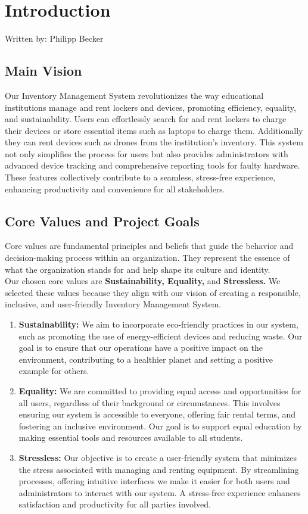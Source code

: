 \section{Introduction}
{\tiny Written by: Philipp Becker}\\
\subsection{Main Vision}
Our Inventory Management System revolutionizes the way educational institutions manage and rent lockers and devices, promoting efficiency, equality, and sustainability. Users can effortlessly search for and rent lockers to charge their devices or store essential items such as laptops to charge them. Additionally they can rent devices such as drones from the institution's inventory. This system not only simplifies the process for users but also provides administrators with advanced device tracking and comprehensive reporting tools for faulty hardware. These features collectively contribute to a seamless, stress-free experience, enhancing productivity and convenience for all stakeholders.

\subsection{Core Values and Project Goals}
Core values are fundamental principles and beliefs that guide the behavior and decision-making process within an organization. They represent the essence of what the organization stands for and help shape its culture and identity. \\Our chosen core values are \textbf{Sustainability, Equality,} and \textbf{Stressless.} We selected these values because they align with our vision of creating a responsible, inclusive, and user-friendly Inventory Management System.

\begin{enumerate}
\item \textbf{Sustainability:} We aim to incorporate eco-friendly practices in our system, such as promoting the use of energy-efficient devices and reducing waste. Our goal is to ensure that our operations have a positive impact on the environment, contributing to a healthier planet and setting a positive example for others.
\item \textbf{Equality:} We are committed to providing equal access and opportunities for all users, regardless of their background or circumstances. This involves ensuring our system is accessible to everyone, offering fair rental terms, and fostering an inclusive environment. Our goal is to support equal education by making essential tools and resources available to all students.

\item \textbf{Stressless:} Our objective is to create a user-friendly system that minimizes the stress associated with managing and renting equipment. By streamlining processes, offering intuitive interfaces we make it easier for both users and administrators to interact with our system. A stress-free experience enhances satisfaction and productivity for all parties involved.
\end{enumerate}

